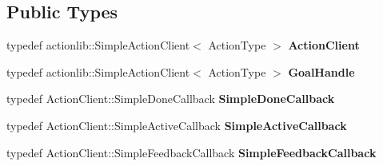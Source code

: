 \subsection*{Public Types}
\begin{DoxyCompactItemize}
\item 
typedef actionlib\+::\+Simple\+Action\+Client$<$ Action\+Type $>$ {\bfseries Action\+Client}\hypertarget{classsmacc_1_1SmaccActionClientBase_aea1392d9e41f48bda1de8acaec1c3233}{}\label{classsmacc_1_1SmaccActionClientBase_aea1392d9e41f48bda1de8acaec1c3233}

\item 
typedef actionlib\+::\+Simple\+Action\+Client$<$ Action\+Type $>$ {\bfseries Goal\+Handle}\hypertarget{classsmacc_1_1SmaccActionClientBase_a70384df77a0bbf416475e730960a77cf}{}\label{classsmacc_1_1SmaccActionClientBase_a70384df77a0bbf416475e730960a77cf}

\item 
typedef Action\+Client\+::\+Simple\+Done\+Callback {\bfseries Simple\+Done\+Callback}\hypertarget{classsmacc_1_1SmaccActionClientBase_a185a419026fcdbec9ddf4703a1505524}{}\label{classsmacc_1_1SmaccActionClientBase_a185a419026fcdbec9ddf4703a1505524}

\item 
typedef Action\+Client\+::\+Simple\+Active\+Callback {\bfseries Simple\+Active\+Callback}\hypertarget{classsmacc_1_1SmaccActionClientBase_ab99def4cdf0522abaf5a3bf7a444cfcb}{}\label{classsmacc_1_1SmaccActionClientBase_ab99def4cdf0522abaf5a3bf7a444cfcb}

\item 
typedef Action\+Client\+::\+Simple\+Feedback\+Callback {\bfseries Simple\+Feedback\+Callback}\hypertarget{classsmacc_1_1SmaccActionClientBase_ad8a68f659fb23e082e75d220515c76f3}{}\label{classsmacc_1_1SmaccActionClientBase_ad8a68f659fb23e082e75d220515c76f3}

\end{DoxyCompactItemize}

